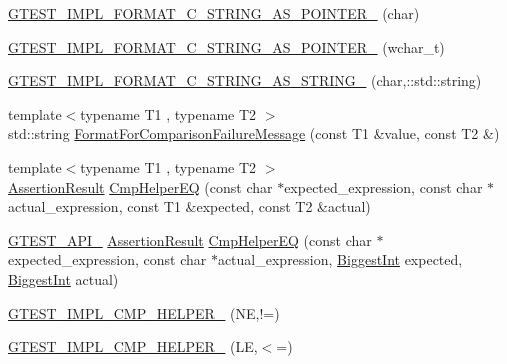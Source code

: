 \begin{DoxyCompactItemize}
\item 
\hyperlink{namespacetesting_1_1internal_a3682f962ae0ec1c0eca6444ca0a09e91}{G\+T\+E\+S\+T\+\_\+\+I\+M\+P\+L\+\_\+\+F\+O\+R\+M\+A\+T\+\_\+\+C\+\_\+\+S\+T\+R\+I\+N\+G\+\_\+\+A\+S\+\_\+\+P\+O\+I\+N\+T\+E\+R\+\_\+} (char)
\item 
\hyperlink{namespacetesting_1_1internal_a85e08f00d443221e529a0a85a90fbaeb}{G\+T\+E\+S\+T\+\_\+\+I\+M\+P\+L\+\_\+\+F\+O\+R\+M\+A\+T\+\_\+\+C\+\_\+\+S\+T\+R\+I\+N\+G\+\_\+\+A\+S\+\_\+\+P\+O\+I\+N\+T\+E\+R\+\_\+} (wchar\+\_\+t)
\item 
\hyperlink{namespacetesting_1_1internal_a9dceb71a64d780beb2db1ed5bf24ad3f}{G\+T\+E\+S\+T\+\_\+\+I\+M\+P\+L\+\_\+\+F\+O\+R\+M\+A\+T\+\_\+\+C\+\_\+\+S\+T\+R\+I\+N\+G\+\_\+\+A\+S\+\_\+\+S\+T\+R\+I\+N\+G\+\_\+} (char,\+::std\+::string)
\item 
{\footnotesize template$<$typename T1 , typename T2 $>$ }\\std\+::string \hyperlink{namespacetesting_1_1internal_a91ab078f10adc669f09b7f604975c518}{Format\+For\+Comparison\+Failure\+Message} (const T1 \&value, const T2 \&)
\item 
{\footnotesize template$<$typename T1 , typename T2 $>$ }\\\hyperlink{classtesting_1_1_assertion_result}{Assertion\+Result} \hyperlink{namespacetesting_1_1internal_a36f7c44fad92225cbb45fde1642cf30e}{Cmp\+Helper\+E\+Q} (const char $\ast$expected\+\_\+expression, const char $\ast$actual\+\_\+expression, const T1 \&expected, const T2 \&actual)
\item 
\hyperlink{gtest-port_8h_aa73be6f0ba4a7456180a94904ce17790}{G\+T\+E\+S\+T\+\_\+\+A\+P\+I\+\_\+} \hyperlink{classtesting_1_1_assertion_result}{Assertion\+Result} \hyperlink{namespacetesting_1_1internal_a697feef6eee5aa00dd9cfe0708430572}{Cmp\+Helper\+E\+Q} (const char $\ast$expected\+\_\+expression, const char $\ast$actual\+\_\+expression, \hyperlink{namespacetesting_1_1internal_a05c6bd9ede5ccdf25191a590d610dcc6}{Biggest\+Int} expected, \hyperlink{namespacetesting_1_1internal_a05c6bd9ede5ccdf25191a590d610dcc6}{Biggest\+Int} actual)
\item 
\hyperlink{namespacetesting_1_1internal_aa3a0659f0e495c276d69bc9beddb268a}{G\+T\+E\+S\+T\+\_\+\+I\+M\+P\+L\+\_\+\+C\+M\+P\+\_\+\+H\+E\+L\+P\+E\+R\+\_\+} (N\+E,!=)
\item 
\hyperlink{namespacetesting_1_1internal_ade60646b18728043fff84d7b4125de2c}{G\+T\+E\+S\+T\+\_\+\+I\+M\+P\+L\+\_\+\+C\+M\+P\+\_\+\+H\+E\+L\+P\+E\+R\+\_\+} (L\+E,$<$=)
\item 

\end{DoxyCompactItemize}
